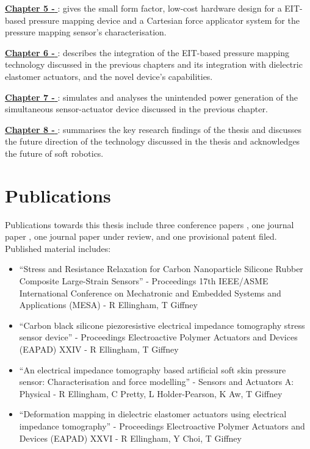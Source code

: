 \hyperref[chapter5]{\textbf{Chapter 5 - \chapvname}}: gives the small form factor, low-cost hardware design for a EIT-based pressure mapping device and a Cartesian force applicator system for the pressure mapping sensor's characterisation.

\hyperref[chapter6]{\textbf{Chapter 6 - \chapviname}}: describes the integration of the EIT-based pressure mapping technology discussed in the previous chapters and its integration with dielectric elastomer actuators, and the novel device's capabilities.

\hyperref[chapter7]{\textbf{Chapter 7 - \chapviiname}}: simulates and analyses the unintended power generation of the simultaneous sensor-actuator device discussed in the previous chapter.

\hyperref[chapter8]{\textbf{Chapter 8 - \chapviiiname}}: summarises the key research findings of the thesis and discusses the future direction of the technology discussed in the thesis and acknowledges the future of soft robotics.

\section{Publications}
Publications towards this thesis include three conference papers \cite{Ellingham2021,Ellingham2022,Ellingham2024a}, one journal paper \cite{Ellingham2024}, one journal paper under review, and one provisional patent filed\cite{Ellingham2025}. Published material includes:
\begin{itemize}
	\item ``Stress and Resistance Relaxation for Carbon Nanoparticle Silicone Rubber Composite Large-Strain Sensors'' - Proceedings 17th IEEE/ASME International Conference on Mechatronic and Embedded Systems and Applications (MESA) - R Ellingham, T Giffney
	\item ``Carbon black silicone piezoresistive electrical impedance tomography stress sensor device'' -  Proceedings Electroactive Polymer Actuators and Devices (EAPAD) XXIV - R Ellingham, T Giffney
	\item ``An electrical impedance tomography based artificial soft skin pressure sensor: Characterisation and force modelling'' - Sensors and Actuators A: Physical - R Ellingham, C Pretty, L Holder-Pearson, K Aw, T Giffney
	\item ``Deformation mapping in dielectric elastomer actuators using electrical impedance tomography'' - Proceedings Electroactive Polymer Actuators and Devices (EAPAD) XXVI - R Ellingham, Y Choi, T Giffney
\end{itemize}

\cleardoublepage